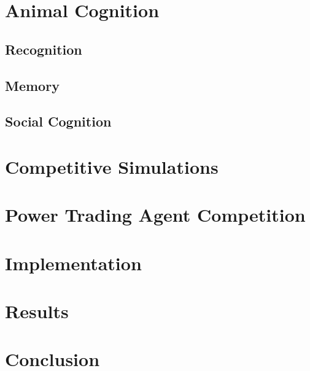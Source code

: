 \chapter{Animal Cognition}
\section{Recognition}
\section{Memory}
\section{Social Cognition}

\chapter{Competitive Simulations}%

\chapter{Power Trading Agent Competition}


\chapter{Implementation}


\chapter{Results}
\chapter{Conclusion}

